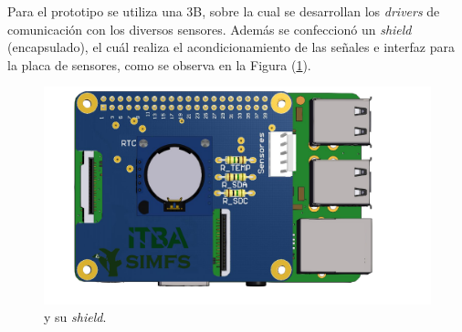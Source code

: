 
\Subsubsection{\rspi}
Para el prototipo se utiliza una \rspi 3B, sobre la cual se desarrollan los \textit{drivers} de comunicación con los diversos sensores. Además se confeccionó un \textit{shield} (encapsulado), el cuál realiza el acondicionamiento de las señales e interfaz para la placa de sensores, como se observa en la Figura (\ref{fig:shield}).
\begin{figure}[H]
	\centering	\includegraphics[width=0.6\linewidth,page=1]{ImagenesConstruccion del prototipo/shieldSensor}		
	\caption{\rspi y su \textit{shield}.}
	\label{fig:shield}
\end{figure}

